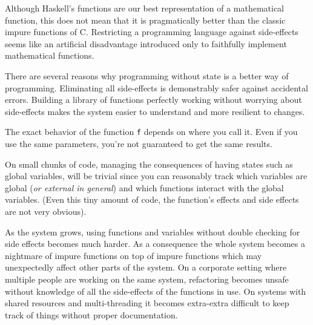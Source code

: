 Although Haskell's functions are our best representation of a
mathematical function, this does not mean that it is pragmatically
better than the classic impure functions of C. Restricting a programming
language against side-effects seems like an artificial disadvantage
introduced only to faithfully implement mathematical functions.

There are several reasons why programming without state is a better way
of programming. Eliminating all side-effects is demonstrably safer
against accidental errors. Building a library of functions perfectly
working without worrying about side-effects makes the system easier to
understand and more resilient to changes.

\begin{Shaded}
\begin{Highlighting}[]
\OperatorTok{(} \OperatorTok{*}\OperatorTok{,} \OperatorTok{)\{}
  \OperatorTok{*}\OperatorTok{=} \OperatorTok{*}\OperatorTok{+}\OperatorTok{;}
\OperatorTok{(}\OperatorTok{,*}\OperatorTok{);}
  \OperatorTok{;}
\OperatorTok{\}}
\OperatorTok{(}\OperatorTok{)} \OperatorTok{\{}
  \OperatorTok{=} \OperatorTok{;}
\OperatorTok{(\&}\OperatorTok{,} \OperatorTok{);}
\OperatorTok{=}\OperatorTok{{-}} \OperatorTok{;}
\OperatorTok{(\&}\OperatorTok{,} \OperatorTok{);}
\OperatorTok{\}}
\end{Highlighting}
\end{Shaded}

The exact behavior of the function \texttt{f} depends on where you call
it. Even if you use the same parameters, you're not guaranteed to get
the same results.

On small chunks of code, managing the consequences of having states such
as global variables, will be trivial since you can reasonably track
which variables are global (\emph{or external in general}) and which
functions interact with the global variables. (Even this tiny amount of
code, the function's effects and side effects are not very obvious).

As the system grows, using functions and variables without double
checking for side effects becomes much harder. As a consequence the
whole system becomes a nightmare of impure functions on top of impure
functions which may unexpectedly affect other parts of the system. On a
corporate setting where multiple people are working on the same system,
refactoring becomes unsafe without knowledge of all the side-effects of
the functions in use. On systems with shared resources and
multi-threading it becomes extra-extra difficult to keep track of things
without proper documentation.

